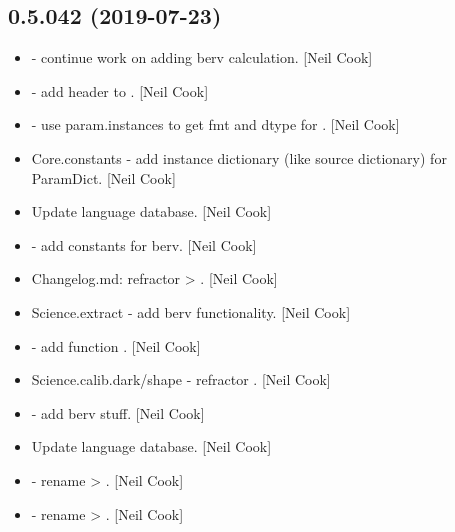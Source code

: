 \documentclass[a4paper,10pt,english]{report}
\begin{document}
\subsection{0.5.042 (2019-07-23)}
\label{\detokenize{misc/changelog:id99}}\begin{itemize}
\item {} 
 - continue work on adding berv calculation.
{[}Neil Cook{]}

\item {} 
 - add header to . {[}Neil Cook{]}

\item {} 
 - use param.instances to get fmt and dtype for .
{[}Neil Cook{]}

\item {} 
Core.constants - add instance dictionary (like source dictionary) for
ParamDict. {[}Neil Cook{]}

\item {} 
Update language database. {[}Neil Cook{]}

\item {} 
 - add constants for berv. {[}Neil Cook{]}

\item {} 
Changelog.md: refractor  \textendash{}\textgreater{} . {[}Neil Cook{]}

\item {} 
Science.extract - add berv functionality. {[}Neil Cook{]}

\item {} 
 - add function . {[}Neil Cook{]}

\item {} 
Science.calib.dark/shape - refractor .
{[}Neil Cook{]}

\item {} 
 - add berv stuff. {[}Neil Cook{]}

\item {} 
Update language database. {[}Neil Cook{]}

\item {} 
 - rename  \textendash{}\textgreater{} . {[}Neil Cook{]}

\item {} 
 - rename  \textendash{}\textgreater{} . {[}Neil
Cook{]}

\end{itemize}
\end{document}
